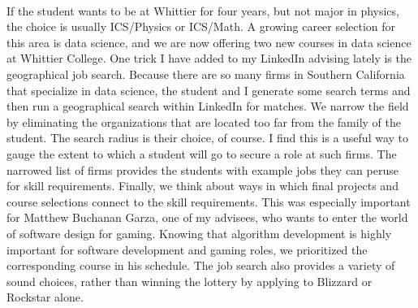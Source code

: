\documentclass[../../../main.tex]{subfiles}
\begin{document}
\\
\vspace{0.25cm}
If the student wants to be at Whittier for four years, but not major in physics, the choice is usually ICS/Physics or ICS/Math.  A growing career selection for this area is data science, and we are now offering two new courses in data science at Whittier College.  One trick I have added to my LinkedIn advising lately is the geographical job search.  Because there are so many firms in Southern California that specialize in data science, the student and I generate some search terms and then run a geographical search within LinkedIn for matches.  We narrow the field by eliminating the organizations that are located too far from the family of the student.  The search radius is their choice, of course.  I find this is a useful way to gauge the extent to which a student will go to secure a role at such firms.  The narrowed list of firms provides the students with example jobs they can peruse for skill requirements.  Finally, we think about ways in which final projects and course selections connect to the skill requirements.  This was especially important for Matthew Buchanan Garza, one of my advisees, who wants to enter the world of software design for gaming.  Knowing that algorithm development is highly important for software development and gaming roles, we prioritized the corresponding course in his schedule.  The job search also provides a variety of sound choices, rather than winning the lottery by applying to Blizzard or Rockstar alone.
\end{document}
